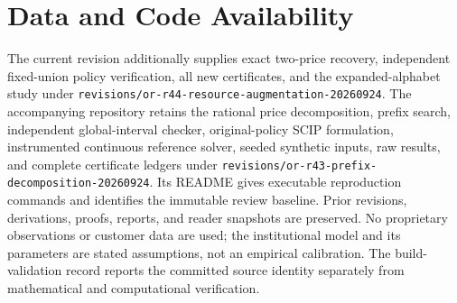 \section*{Data and Code Availability}
The current revision additionally supplies exact two-price recovery, independent fixed-union policy verification, all new certificates, and the expanded-alphabet study under \nolinkurl{revisions/or-r44-resource-augmentation-20260924}. The accompanying repository retains the rational price decomposition, prefix search, independent global-interval checker, original-policy SCIP formulation, instrumented continuous reference solver, seeded synthetic inputs, raw results, and complete certificate ledgers under \nolinkurl{revisions/or-r43-prefix-decomposition-20260924}. Its README gives executable reproduction commands and identifies the immutable review baseline. Prior revisions, derivations, proofs, reports, and reader snapshots are preserved. No proprietary observations or customer data are used; the institutional model and its parameters are stated assumptions, not an empirical calibration. The build-validation record reports the committed source identity separately from mathematical and computational verification.

